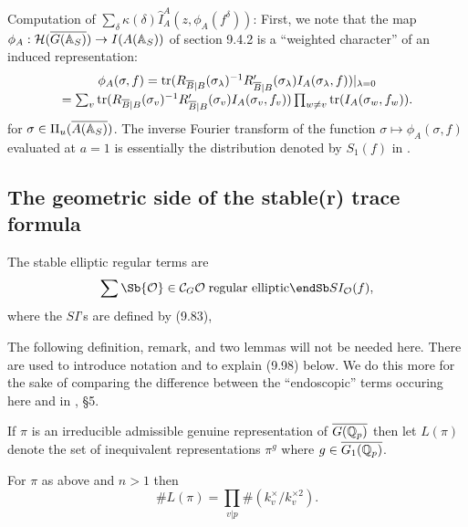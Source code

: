 Computation of $\sum_\delta \kappa(\delta)\hat{I}_A^A(z,\phi_A(f^\delta))$:
First, we note that the map
$\phi_A:{\cal{H}}(\overline{G({\Bbb{A}}_S)}) \rightarrow I(A({\Bbb{A}}_S))$
of section 9.4.2 is a ``weighted
character'' of an induced representation:
\begin{equation}
\begin{array}{c}
\phi_A(\sigma,f)=
{\rm tr}(R_{\overline{B}|B}(\sigma_\lambda)^{-1}
R'_{\overline{B}|B}(\sigma_\lambda)I_A(\sigma_\lambda,f))|_{\lambda =0}\\
=\sum_v
{\rm tr}(R_{\overline{B}|B}(\sigma_v)^{-1}
R'_{\overline{B}|B}(\sigma_v)I_A(\sigma_v,f_v))
\prod_{w\not= v}{\rm tr}(I_A(\sigma_w,f_w)).
\end{array}
\end{equation}
for $\sigma\in \Pi_u(\overline{A({\Bbb{A}}_S)})$.
The inverse Fourier transform of the function
$\sigma\longmapsto \phi_A(\sigma, f)$ evaluated at $a=1$ is
essentially the distribution denoted by $S_1(f)$ in \cite{LL}.

\subsection{The geometric side of the stable(r) trace formula}

The stable elliptic regular terms are 
\begin{equation}
\sum\Sb {\mathcal{O}}\in {\mathcal{C}}_G \\
\mathcal{O}\;\mathrm{regular\ elliptic} \endSb
SI_{\mathcal{O}}(f),
\end{equation}
where the $SI$'s are defined by (9.83), 

The following definition, remark, and two lemmas will not be needed here.
There are used to introduce notation and to explain (9.98) below.
We do this more for the sake of comparing the difference
between the ``endoscopic'' terms occuring here and in \cite{LL}, \S 5.

\begin{definition} If $\pi$ is an irreducible admissible
genuine representation of
$\overline{G({\Bbb Q}_p)}$ then let
$L(\pi)$ denote the set of inequivalent representations
$\pi^g$ where $g\in \overline{G_1({\Bbb{Q}}_p)}$.
\end{definition}

\begin{remark} For $\pi$ as above and $n>1$ then
\[
\# L(\pi)=
\prod_{v|p}\#( k_v^\times/k_v^{\times 2}).
\]
\end{remark}

